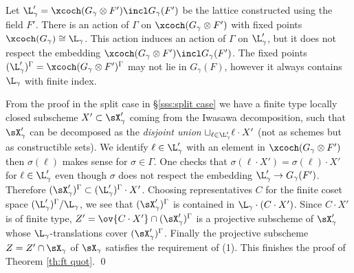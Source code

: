 Let $\L'_{\gamma}=\xcoch(G_{\gamma}\otimes F')\incl G_{\gamma}(F')$ be the lattice constructed using the field $F'$. There is an action of $\Gamma$ on $\xcoch(G_{\gamma}\otimes F')$ with fixed points $\xcoch(G_{\gamma})\cong \L_{\gamma}$. This action induces an action of $\Gamma$ on $\L'_{\gamma}$, but it does not respect the embedding $\xcoch(G_{\gamma}\otimes F')\incl G_{\gamma}(F')$. The fixed points $(\L'_{\gamma})^{\Gamma}=\xcoch(G_{\gamma}\otimes F')^{\Gamma}$ may not lie in $G_{\gamma}(F)$, however it always contains $\L_{\gamma}$ with finite index. 

From the proof in the split case in \S\ref{sss:split case} we have a finite type locally closed subscheme $X'\subset\sX'_{\gamma}$ coming from the Iwasawa decomposition, such that $\sX'_{\gamma}$ can be decomposed as the {\em disjoint union} $\sqcup_{\ell\in\L'_{\gamma}}\ell\cdot X'$  (not as schemes but as constructible sets). We identify $\ell\in \L'_{\gamma}$ with an element in $\xcoch(G_{\gamma}\otimes F')$ then $\sigma(\ell)$ makes sense for $\sigma\in\Gamma$. One checks that $\sigma(\ell\cdot X')=\sigma(\ell)\cdot X'$ for $\ell\in\L'_{\gamma}$ even though $\sigma$ does not respect the embedding $\L'_{\gamma}\to G_{\gamma}(F')$. Therefore $(\sX'_{\gamma})^{\Gamma}\subset (\L'_{\gamma})^{\Gamma}\cdot X'$. Choosing representatives $C$ for the finite coset space $(\L'_{\gamma})^{\Gamma}/\L_{\gamma}$, we see that $(\sX'_{\gamma})^{\Gamma}$ is contained in $\L_{\gamma}\cdot (C\cdot X')$. Since $C\cdot X'$ is of finite type, $Z'=\ov{C\cdot X'}\cap (\sX'_{\gamma})^{\Gamma}$ is a projective subscheme of $\sX'_{\gamma}$ whose $\L_{\gamma}$-translations cover $(\sX'_{\gamma})^{\Gamma}$. Finally the projective subscheme $Z=Z'\cap \sX_{\gamma}$ of $\sX_{\gamma}$ satisfies the requirement of (1).  This finishes the proof of Theorem \ref{th:ft quot}. \qed


